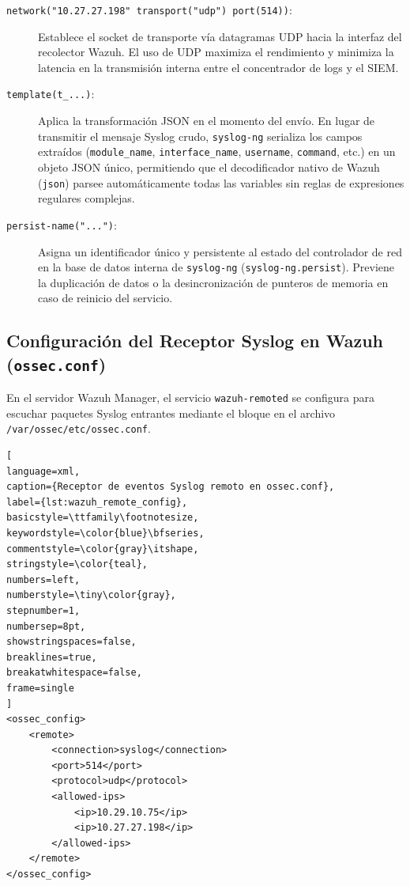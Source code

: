 \begin{description}

\item[\texttt{network("10.27.27.198" transport("udp") port(514))}:] Establece el socket de transporte vía datagramas UDP hacia la interfaz del recolector Wazuh. El uso de UDP maximiza el rendimiento y minimiza la latencia en la transmisión interna entre el concentrador de logs y el SIEM.
\item[\texttt{template(t\_...)}:] Aplica la transformación JSON en el momento del envío. En lugar de transmitir el mensaje Syslog crudo, \texttt{syslog-ng} serializa los campos extraídos (\texttt{module\_name}, \texttt{interface\_name}, \texttt{username}, \texttt{command}, etc.) en un objeto JSON único, permitiendo que el decodificador nativo de Wazuh (\texttt{json}) parsee automáticamente todas las variables sin reglas de expresiones regulares complejas.
\item[\texttt{persist-name("...")}:] Asigna un identificador único y persistente al estado del controlador de red en la base de datos interna de \texttt{syslog-ng} (\texttt{syslog-ng.persist}). Previene la duplicación de datos o la desincronización de punteros de memoria en caso de reinicio del servicio.
\end{description}

\subsection{Configuración del Receptor Syslog en Wazuh (\texttt{ossec.conf})}

En el servidor Wazuh Manager, el servicio \texttt{wazuh-remoted} se configura para escuchar paquetes Syslog entrantes mediante el bloque \texttt{} en el archivo \texttt{/var/ossec/etc/ossec.conf}.

\begin{lstlisting}[
language=xml,
caption={Receptor de eventos Syslog remoto en ossec.conf},
label={lst:wazuh_remote_config},
basicstyle=\ttfamily\footnotesize,
keywordstyle=\color{blue}\bfseries,
commentstyle=\color{gray}\itshape,
stringstyle=\color{teal},
numbers=left,
numberstyle=\tiny\color{gray},
stepnumber=1,
numbersep=8pt,
showstringspaces=false,
breaklines=true,
breakatwhitespace=false,
frame=single
]
<ossec_config>
    <remote>
        <connection>syslog</connection>
        <port>514</port>
        <protocol>udp</protocol>
        <allowed-ips>
            <ip>10.29.10.75</ip>
            <ip>10.27.27.198</ip>
        </allowed-ips>
    </remote>
</ossec_config>
\end{lstlisting}

